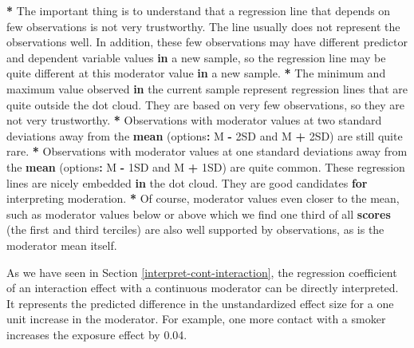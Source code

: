 \documentclass[a4paper]{book}
\newenvironment{Shaded}{\begin{snugshade}}{\end{snugshade}}
\newcommand{\KeywordTok}[1]{\textcolor[rgb]{0,0,0}{\textbf{#1}}}
\newcommand{\StringTok}[1]{\textcolor[rgb]{0.00,0.00,0.00}{#1}}
\newcommand{\ControlFlowTok}[1]{\textcolor[rgb]{0.00,0.00,0.00}{\textbf{#1}}}
\newcommand{\OperatorTok}[1]{\textcolor[rgb]{0.00,0.00,0.00}{\textbf{#1}}}
\newcommand{\NormalTok}[1]{#1}
\theoremstyle{definition}
\theoremstyle{definition}
\theoremstyle{definition}
\theoremstyle{remark}
\begin{document}
\begin{Shaded}
\begin{Highlighting}[]
\OperatorTok{*}\StringTok{ }\NormalTok{The important thing is to understand that a regression line that depends on}
\NormalTok{few observations is not very trustworthy. The line usually does not represent}
\NormalTok{the observations well. In addition, these few observations may have different}
\NormalTok{predictor and dependent variable values }\ControlFlowTok{in}\NormalTok{ a new sample, so the regression line may be}
\NormalTok{quite different at this moderator value }\ControlFlowTok{in}\NormalTok{ a new sample.}
\OperatorTok{*}\StringTok{ }\NormalTok{The minimum and maximum value observed }\ControlFlowTok{in}\NormalTok{ the current sample represent}
\NormalTok{regression lines that are quite outside the dot cloud. They are based on very}
\NormalTok{few observations, so they are not very trustworthy.}
\OperatorTok{*}\StringTok{ }\NormalTok{Observations with moderator values at two standard deviations away from the}
\KeywordTok{mean}\NormalTok{ (options}\OperatorTok{:}\StringTok{ }\NormalTok{M }\OperatorTok{-}\StringTok{ }\NormalTok{2SD and M }\OperatorTok{+}\StringTok{ }\NormalTok{2SD) are still quite rare.}
\OperatorTok{*}\StringTok{ }\NormalTok{Observations with moderator values at one standard deviations away from the}
\KeywordTok{mean}\NormalTok{ (options}\OperatorTok{:}\StringTok{ }\NormalTok{M }\OperatorTok{-}\StringTok{ }\NormalTok{1SD and M }\OperatorTok{+}\StringTok{ }\NormalTok{1SD) are quite common. These regression}
\NormalTok{lines are nicely embedded }\ControlFlowTok{in}\NormalTok{ the dot cloud. They are good candidates }\ControlFlowTok{for}
\NormalTok{interpreting moderation.}
\OperatorTok{*}\StringTok{ }\NormalTok{Of course, moderator values even closer to the mean, such as moderator values}
\NormalTok{below or above which we find one third of all }\KeywordTok{scores}\NormalTok{ (the first and third}
\NormalTok{terciles) are also well supported by observations, as is the moderator mean}
\NormalTok{itself.}
\end{Highlighting}
\end{Shaded}

As we have seen in Section \ref{interpret-cont-interaction}, the
regression coefficient of an interaction effect with a continuous
moderator can be directly interpreted. It represents the predicted
difference in the unstandardized effect size for a one unit increase in
the moderator. For example, one more contact with a smoker increases the
exposure effect by 0.04.
\end{document}
